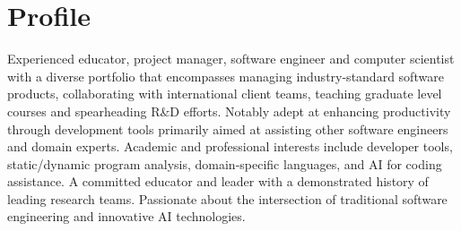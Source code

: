 \documentclass[12pt,a4paper,sans]{moderncv}
\begin{document}
\pagestyle{empty}
\makecvtitle

\section{Profile}

Experienced educator, project manager, software engineer and computer scientist with a diverse portfolio that encompasses managing industry-standard software products, collaborating with international client teams, teaching graduate level courses and spearheading R\&D efforts. Notably adept at enhancing productivity through development tools primarily aimed at assisting other software engineers and domain experts. Academic and professional interests include developer tools, static/dynamic program analysis, domain-specific languages, and AI for coding assistance. A committed educator and leader with a demonstrated history of leading research teams. Passionate about the intersection of traditional software engineering and innovative AI technologies.
\end{document}
